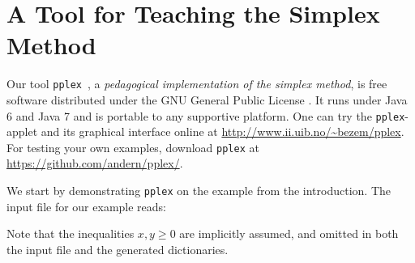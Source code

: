 \documentclass[ukenglish,a4]{article}
\begin{document}

\section{A Tool for Teaching the Simplex Method}\label{sec:pplex}
Our tool \texttt{pplex}~\cite{pplex},
a \emph{pedagogical implementation of the simplex method},
is free software distributed under the GNU General Public License \cite{GNUGPL}.
It runs under Java 6 and Java 7 and is portable to any supportive platform.
One can try the \texttt{pplex}-applet and its graphical interface
online at \url{http://www.ii.uib.no/~bezem/pplex}.
For testing your own examples, download \texttt{pplex} at \url{https://github.com/andern/pplex/}.

We start by demonstrating \texttt{pplex} on the example from the introduction.
The input file for our example reads:
\begin{alltt}

\end{alltt}
Note that the inequalities $x,y \geq 0$ are implicitly assumed, and omitted in both the input file and the generated dictionaries.
\end{document}
